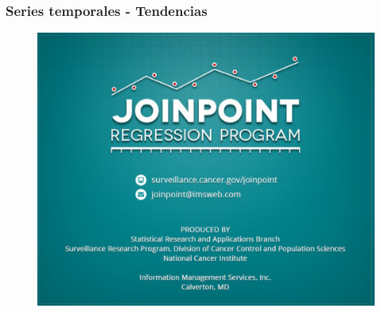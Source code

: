 \documentclass{beamer}
\begin{document}
\begin{frame}\frametitle{Series temporales - Tendencias}
	\begin{figure}
		\centering
		\includegraphics[width=.7\textwidth]{images/joinpoint.png}
	\end{figure}
\end{frame}

\end{document}
